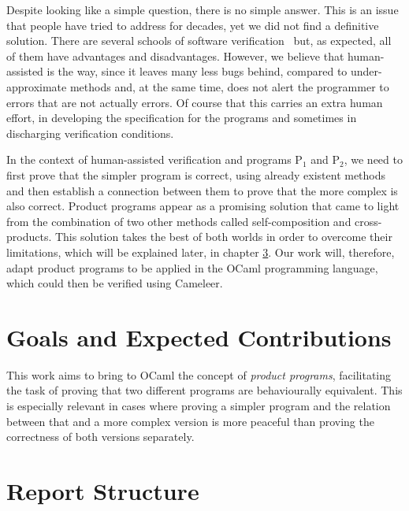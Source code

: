 Despite looking like a simple question, there is no simple answer.
This is an issue that people have tried to address for decades, yet we did not find a definitive solution.
There are several schools of software verification~\cite{DBLP:conf/fm/BrainP24} but, as expected, all of them have advantages and disadvantages.
However, we believe that human-assisted is the way, since it leaves many less bugs behind, compared to under-approximate methods and, at the same time, does not alert the programmer to errors that are not actually errors.
Of course that this carries an extra human effort, in developing the specification for the programs and sometimes in discharging verification conditions.

In the context of human-assisted verification and programs P$_1$ and P$_2$, we need to first prove that the simpler program is correct, using already existent methods and then establish a connection between them to prove that the more complex is also correct.
Product programs appear as a promising solution that came to light from the combination of two other methods called self-composition and cross-products.
This solution takes the best of both worlds in order to overcome their limitations, which will be explained later, in chapter \hyperref[cha:state_of_the_art]{3}.
Our work will, therefore, adapt product programs to be applied in the OCaml programming language, which could then be verified using Cameleer.


\section{Goals and Expected Contributions}

This work aims to bring to OCaml the concept of \emph{product programs}, facilitating the task of proving that two different programs are behaviourally equivalent.
This is especially relevant in cases where proving a simpler program and the relation between that and a more complex version is more peaceful than proving the correctness of both versions separately.


\section{Report Structure}

